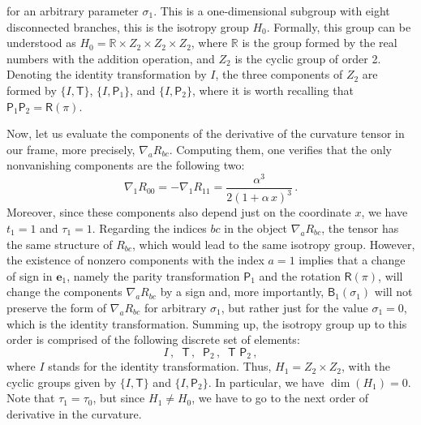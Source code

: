 \documentclass[twocolumn,prd,aps,showpacs,showkeys,amsmath,amssymb]{revtex4-1}
\newcommand{\bl}{\boldsymbol}
\begin{document}
for an arbitrary parameter $\sigma_1$. This is a one-dimensional subgroup with eight disconnected branches, this is the isotropy group $H_0$. Formally, this group can be understood as $H_0 = \mathbb{R}\times Z_2 \times  Z_2 \times Z_2 $, where $\mathbb{R}$ is the group formed by the real numbers with the addition operation, and $Z_2$ is the cyclic group of order 2. Denoting the identity transformation by $I$, the three components of $Z_2$ are formed by $\{I,\textsf{T}\}$, $\{I,\textsf{P}_1\}$, and $\{I,\textsf{P}_2\}$, where it is worth recalling that $\textsf{P}_1\textsf{P}_2 = \textsf{R}(\pi)$.



Now, let us evaluate the components of the derivative of the curvature tensor in our frame,
more precisely, $\nabla_a R_{bc}$. Computing them, one verifies that the only nonvanishing components are the following two:
\begin{equation*}
  \nabla_1 R_{00} = -\nabla_1 R_{11} = \frac{\alpha^3}{2(1+ \alpha \,x)^3}\,.
\end{equation*}
Moreover, since these components also depend just on the coordinate $x$, we have $t_1=1$ and $\tau_1=1$. Regarding the indices $bc$ in the object $\nabla_a R_{bc}$, the tensor has the same structure of $R_{bc}$, which would lead to the same isotropy group. However, the existence of nonzero components with the index $a=1$ implies that a change of sign in $\bl{e}_1$, namely the parity transformation $\textsf{P}_1$ and the rotation $\textsf{R}(\pi)$, will change the components   $\nabla_a R_{bc}$ by a sign and, more importantly, $\textsf{B}_1(\sigma_1)$ will not preserve the form of $\nabla_a R_{bc}$ for arbitrary $\sigma_1$, but rather just for the value $\sigma_1=0$, which is the identity transformation. Summing up, the isotropy group up to this order is comprised of the following discrete set of elements:
\begin{equation*}
 I\,,\;\; \textsf{T}  \,,\;\; \textsf{P}_2   \,,\;\; \textsf{T P}_2 \,,
\end{equation*}
where $I$ stands for the identity transformation. Thus, $H_1 = Z_2\times Z_2$, with the cyclic groups given by $\{I,\textsf{T}\}$ and $\{I,\textsf{P}_2\}$. In particular, we have $\dim(H_1)=0$. Note that $\tau_1 =  \tau_0$, but since $H_1\neq H_0$, we have to go to the next order of derivative in the curvature.
\end{document}
